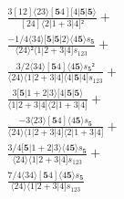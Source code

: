 \documentclass[varwidth, border=5pt]{standalone}
\begin{document}
\begin{my}
$\begin{gathered}
\scriptscriptstyle\frac{3[12]⟨23⟩[𝟓4][4|𝟓|𝟓⟩}{[24]⟨2|1+3|4]²} +\\
\scriptscriptstyle\frac{-1/4⟨34⟩[𝟓|𝟓|2⟩⟨4𝟓⟩s_{𝟓}}{⟨24⟩²⟨1|2+3|4]s_{123}} +\\
\scriptscriptstyle\frac{3/2⟨34⟩[𝟓4]⟨4𝟓⟩s_{𝟓}²}{⟨24⟩⟨1|2+3|4]⟨4|𝟓|4]s_{123}} +\\
\scriptscriptstyle\frac{3[𝟓|1+2|3⟩[4|𝟓|𝟓⟩}{⟨1|2+3|4]⟨2|1+3|4]} +\\
\scriptscriptstyle\frac{-3⟨23⟩[𝟓4]⟨4𝟓⟩s_{𝟓}}{⟨24⟩⟨1|2+3|4]⟨2|1+3|4]} +\\
\scriptscriptstyle\frac{3/4[𝟓|1+2|3⟩⟨4𝟓⟩s_{𝟓}}{⟨24⟩⟨1|2+3|4]s_{123}} +\\
\scriptscriptstyle\frac{7/4⟨34⟩[𝟓4]⟨4𝟓⟩s_{𝟓}}{⟨24⟩⟨1|2+3|4]s_{123}} \phantom{+}
\end{gathered}$
\end{my}
\end{document}
